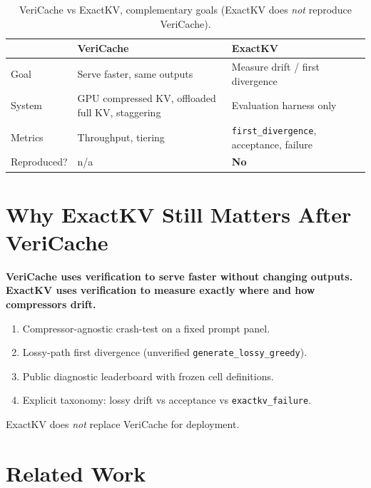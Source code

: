 \documentclass[11pt]{article}
\begin{document}
\begin{table}[htbp]
\centering\small
\caption{VeriCache vs ExactKV, complementary goals (ExactKV does \emph{not} reproduce VeriCache).}
\label{tab:vericache-boundary}
\begin{tabularx}{\textwidth}{@{}>{\raggedright\arraybackslash}p{}>{\raggedright\arraybackslash}X>{\raggedright\arraybackslash}X@{}}
\toprule
 & \textbf{VeriCache} & \textbf{ExactKV} \\ \midrule
Goal & Serve faster, same outputs & Measure drift / first divergence \\
System & GPU compressed KV, offloaded full KV, staggering & Evaluation harness only \\
Metrics & Throughput, tiering & \texttt{first\_divergence}, acceptance, failure \\
Reproduced? & n/a & \textbf{No} \\
\bottomrule
\end{tabularx}
\end{table}

\section{Why ExactKV Still Matters After VeriCache}
\textbf{VeriCache uses verification to serve faster without changing outputs.
ExactKV uses verification to measure exactly where and how compressors drift.}

\begin{enumerate}[noitemsep]
\item Compressor-agnostic crash-test on a fixed prompt panel.
\item Lossy-path first divergence (unverified \texttt{generate\_lossy\_greedy}).
\item Public diagnostic leaderboard with frozen cell definitions.
\item Explicit taxonomy: lossy drift vs acceptance vs \texttt{exactkv\_failure}.
\end{enumerate}
ExactKV does \emph{not} replace VeriCache for deployment.

\section{Related Work}
\end{document}
